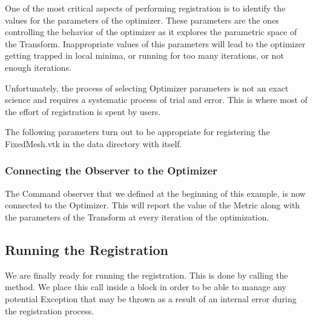 \documentclass{InsightArticle}
\begin{document}
One of the most critical aspects of performing registration is to identify the
values for the parameters of the optimizer. These parameters are the ones
controlling the behavior of the optimizer as it explores the parametric space
of the Transform. Inappropriate values of this parameters will lead to the
optimizer getting trapped in local minima, or running for too many iterations,
or not enough iterations.

Unfortunately, the process of selecting Optimizer parameters is not an exact
science and requires a systematic process of trial and error. This is where
most of the effort of registration is spent by users.

The following parameters turn out to be appropriate for registering the
FixedMesh.vtk in the data directory with itself.

\begin{center}

\end{center}



\subsubsection{Connecting the Observer to the Optimizer}

The Command observer that we defined at the beginning of this example, is now
connected to the Optimizer.  This will report the value of the Metric along
with the parameters of the Transform at every iteration of the optimization.

\begin{center}

\end{center}


\subsection{Running the Registration}

We are finally ready for running the registration. This is done by calling the
 method. We place this call inside a 
block in order to be able to manage any potential Exception that may be thrown
as a result of an internal error during the registration process.

\begin{center}

\end{center}
\end{document}

